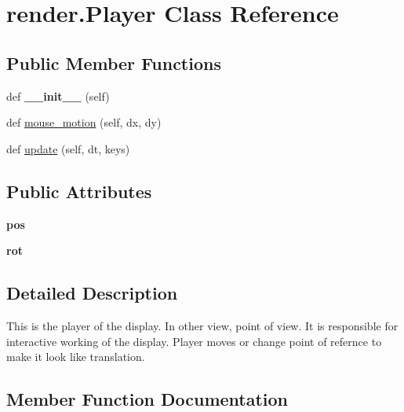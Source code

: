 \hypertarget{classrender_1_1Player}{}\section{render.\+Player Class Reference}
\label{classrender_1_1Player}
\subsection*{Public Member Functions}
\begin{DoxyCompactItemize}
\item 
\mbox{\label{classrender_1_1Player_a42861da4c3770c738b8ef6d647e49c63}} 
def {\bfseries \+\_\+\+\_\+init\+\_\+\+\_\+} (self)
\item 
def \hyperlink{classrender_1_1Player_a111107024ccfdd75ba6fd8cfe291c65a}{mouse\+\_\+motion} (self, dx, dy)
\item 
def \hyperlink{classrender_1_1Player_abfc260eae15590061b8a0a463d0055c6}{update} (self, dt, keys)
\end{DoxyCompactItemize}
\subsection*{Public Attributes}
\begin{DoxyCompactItemize}
\item 
\mbox{\label{classrender_1_1Player_a61aa94d08cdbf8edf34e855e2d8ffbb6}} 
{\bfseries pos}
\item 
\mbox{\label{classrender_1_1Player_ad9b09445f801ce13f83ae6713630f0b2}} 
{\bfseries rot}
\end{DoxyCompactItemize}


\subsection{Detailed Description}
\begin{DoxyVerb}This is the player of the display. In other view, point of view. It is responsible for interactive working of the display. Player moves or change point of refernce to make it look like translation.\end{DoxyVerb}
 

\subsection{Member Function Documentation}
\mbox{\label{classrender_1_1Player_a111107024ccfdd75ba6fd8cfe291c65a}} 
